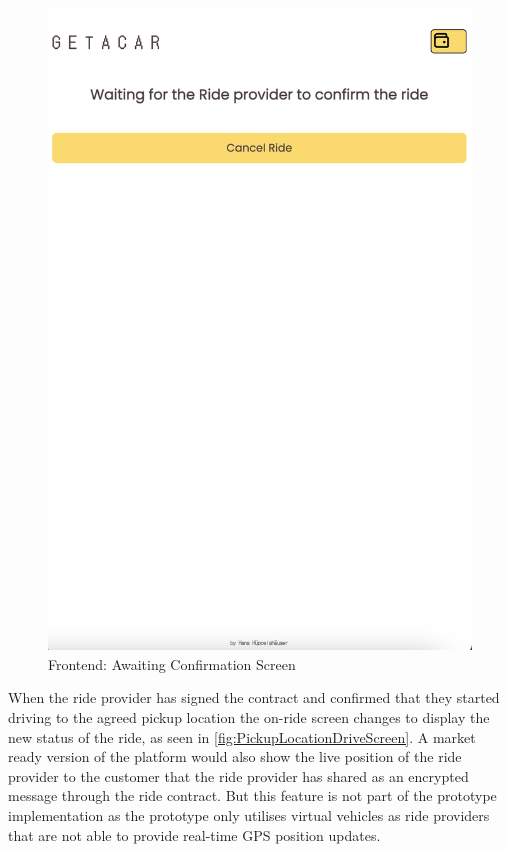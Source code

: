 \begin{figure}[H]
\begin{minipage}{0.45\linewidth}
        \label{fig:RideOverviewScreen}
    \end{minipage}
    \hfill
    \begin{minipage}{0.45\linewidth}
        \centering
        \includegraphics[width=\linewidth]{data/ffss/6.png}
        \caption{Frontend: Awaiting Confirmation Screen}
        \label{fig:AwaitingConfirmationScreen}
    \end{minipage}
    
\end{figure}

When the ride provider has signed the contract and confirmed that they started driving to the agreed pickup location the on-ride screen changes to display the new status of the ride, as seen in \ref{fig:PickupLocationDriveScreen}. A market ready version of the platform would also show the live position of the ride provider to the customer that the ride provider has shared as an encrypted message through the ride contract. But this feature is not part of the prototype implementation as the prototype only utilises virtual vehicles as ride providers that are not able to provide real-time GPS position updates.

